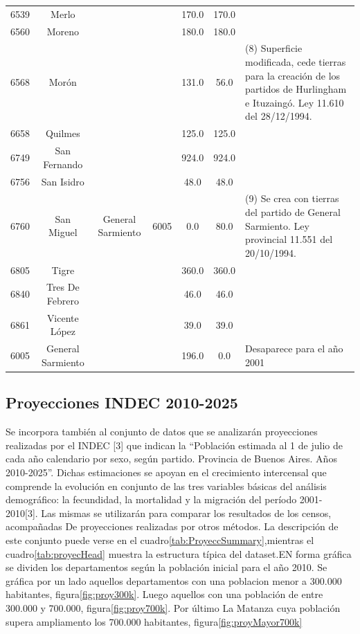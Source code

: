 \documentclass{article}
\theoremstyle{mytheoremstyle}
\theoremstyle{mytheoremstyle}
\theoremstyle{myproblemstyle}
\begin{document}
\begin{table}[htbp]
\begin{tabular}{|c|c|c|c|c|c|p{5cm}|}
        6539 & Merlo             && & 170.0             & 170.0 &   \\
        6560 & Moreno              &&& 180.0             & 180.0 & \\
        6568 & Morón                &&& 131.0             & 56.0  & (8) Superficie  modificada, cede tierras para la creación de los partidos de Hurlingham e Ituzaingó. Ley 11.610 del 28/12/1994.\\
        6658 & Quilmes            && & 125.0             & 125.0 &       \\
        6749 & San Fernando       && & 924.0             & 924.0 &    \\
        6756 & San Isidro         && & 48.0              & 48.0  &    \\
        6760 & San Miguel          & General Sarmiento & 6005  & 0.0 & 80.0 & (9) Se crea con tierras del partido de General Sarmiento. Ley provincial 11.551 del 20/10/1994. \\
        6805 & Tigre            &&   & 360.0             & 360.0 &     \\
        6840 & Tres De Febrero   &&  & 46.0              & 46.0  &      \\
        6861 & Vicente López     &&  & 39.0              & 39.0  &  \\
        6005 & General Sarmiento  && & 196.0             & 0.0   & Desaparece para el año 2001   \\        
     \hline
    \end{tabular}
    \label{tab:DimDepto}
\end{table}

\subsection{Proyecciones INDEC 2010-2025}
Se incorpora también al conjunto de datos que se analizarán proyecciones realizadas por el INDEC [3] que indican la “Población estimada al 1 de julio de
 cada año calendario por sexo, según partido. Provincia de Buenos Aires. Años 2010-2025”.
 Dichas estimaciones se apoyan en el crecimiento intercensal que comprende la evolución en conjunto
 de las tres variables básicas del análisis demográfico: la fecundidad, la mortalidad y la migración del período
 2001-2010[3].  Las mismas se utilizarán para comparar los resultados de los censos, acompañadas De
 proyecciones realizadas por otros métodos.\newline
 La  descripción de este conjunto  puede verse en el  cuadro\ref{tab:ProyeccSummary},mientras el cuadro\ref{tab:proyecHead} muestra la estructura típica del 
 dataset.EN forma gráfica se dividen los departamentos según la población inicial para el año 2010. Se gráfica por un lado aquellos
 departamentos con una poblacion menor a 300.000 habitantes, figura\ref{fig:proy300k}. Luego aquellos con una población de entre 300.000 y 700.000,
  figura\ref{fig:proy700k}. Por último La Matanza cuya población supera ampliamento los 700.000 habitantes, figura\ref{fig:proyMayor700k}
\end{document}
